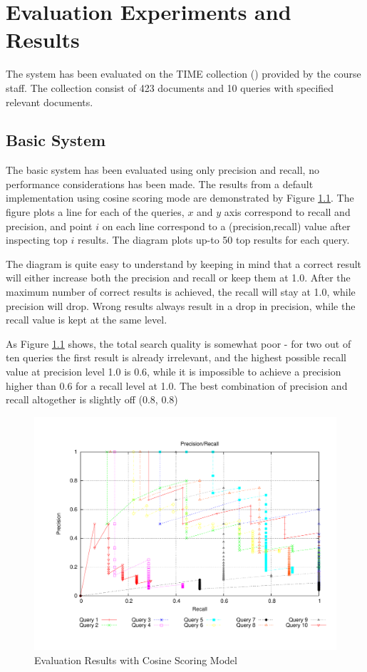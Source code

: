 \chapter{Evaluation Experiments and Results}
\label{sec:results}
\thispagestyle{fancy}
The system has been evaluated on the TIME collection (\cite{TIME}) provided by the course staff. The collection consist of 423 documents and 10 queries with specified relevant documents.

\section{Basic System}
The basic system has been evaluated using only precision and recall, no performance considerations has been made. The results from a default implementation using cosine scoring mode are demonstrated by Figure \ref{fig:cosine}. The figure plots a line for each of the queries, $x$ and $y$ axis correspond to recall and precision, and point $i$ on each line correspond to a (precision,recall) value after inspecting top $i$ results. The diagram plots up-to 50 top results for each query.

The diagram is quite easy to understand by keeping in mind that a correct result will either increase both the precision and recall or keep them at 1.0. After the maximum number of correct results is achieved, the recall will stay at 1.0, while precision will drop. Wrong results always result in a drop in precision, while the recall value is kept at the same level.

As Figure \ref{fig:cosine} shows, the total search quality is somewhat poor - for two out of ten queries the first result is already irrelevant, and the highest possible recall value at precision level 1.0 is 0.6, while it is impossible to achieve a precision higher than 0.6 for a recall level at 1.0. The best combination of precision and recall altogether is slightly off (0.8, 0.8)

\begin{figure}
\includegraphics[width=1.0\textwidth]{include/bench_cosine}
\caption{Evaluation Results with Cosine Scoring Model}
\label{fig:cosine}
\end{figure}

